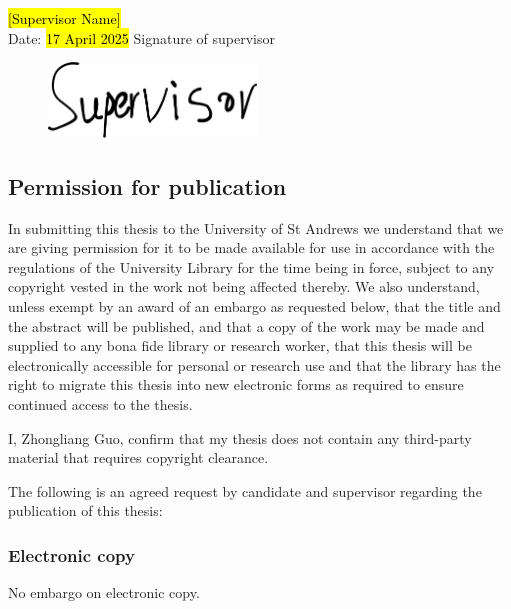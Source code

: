 \begin{declaration}
\hspace{13em}\hl{[Supervisor Name]}\\
Date: \hl{17 April 2025} \hspace{4em} Signature of supervisor
\vspace{-2.0cm}
\begin{figure}[H]
\hspace{25em}
\includegraphics[height=2cm]{prologue/signatures/supervisor-sig.png}
\end{figure}

\newpage
\subsection*{Permission for publication}
In submitting this thesis to the University of St Andrews we understand that we are giving permission for it to be made available for use in accordance with the regulations of the University Library for the time being in force, subject to any
copyright vested in the work not being affected thereby. We also understand, unless exempt by an award of an embargo as requested below, that the title and the abstract will be published, and that a copy of the work may be made and supplied to any bona fide library or research worker, that this thesis will be electronically accessible for personal or research use and that the library has the right to migrate this thesis into new electronic forms as required to ensure continued access to the thesis.

I, Zhongliang Guo, confirm that my thesis does not contain any third-party material that requires copyright clearance.

The following is an agreed request by candidate and supervisor regarding the publication of this thesis:

\vspace{8pt}

\subsubsection*{Electronic copy}
No embargo on electronic copy.
\vspace{48pt}


\end{declaration}
